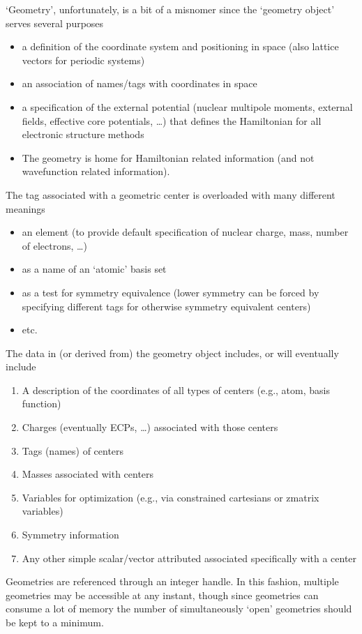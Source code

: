   `Geometry', unfortunately, is a bit of a misnomer since the
`geometry object' serves several purposes
\begin{itemize}
\item a definition of the coordinate system and positioning in space
  (also lattice vectors for periodic systems)
\item an association of names/tags with coordinates in space
\item a specification of the external potential (nuclear multipole
  moments, external fields, effective core potentials, \ldots) that
  defines the Hamiltonian for all electronic structure methods
\item The geometry is home for Hamiltonian related information (and
  not wavefunction related information).
\end{itemize}

The tag associated with a geometric center is overloaded with many
different meanings
\begin{itemize}
\item an element (to provide default specification of nuclear charge,
  mass, number of electrons, \ldots)
\item as a name of an `atomic' basis set
\item as a test for symmetry equivalence (lower symmetry can be forced
     by specifying different tags for otherwise symmetry equivalent
     centers)
\item etc.
\end{itemize}

The data in (or derived from) the geometry object includes, or will
eventually include
\begin{enumerate}
\item A description of the coordinates of all types of centers (e.g.,
      atom, basis function)
\item Charges (eventually ECPs, \ldots) associated with those centers
\item Tags (names) of centers
\item Masses associated with centers
\item Variables for optimization (e.g., via constrained cartesians
      or zmatrix variables)
\item Symmetry information
\item Any other simple scalar/vector attributed associated
      specifically with a center
\end{enumerate}

Geometries are referenced through an integer handle.  In this fashion,
multiple geometries may be accessible at any instant, though since
geometries can consume a lot of memory the number of simultaneously
`open' geometries should be kept to a minimum.

